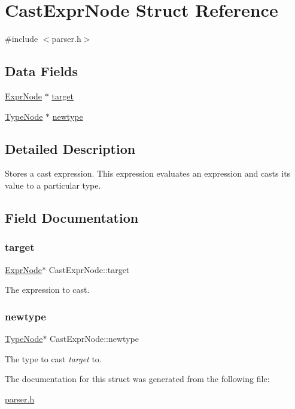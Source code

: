 \hypertarget{struct_cast_expr_node}{}\section{Cast\+Expr\+Node Struct Reference}
\label{struct_cast_expr_node}


{\ttfamily \#include $<$parser.\+h$>$}

\subsection*{Data Fields}
\begin{DoxyCompactItemize}
\item 
\hyperlink{struct_expr_node}{Expr\+Node} $\ast$ \hyperlink{struct_cast_expr_node_a90d1ac82b5b4a63a6842fc4e33f4e3bb}{target}
\item 
\hyperlink{struct_type_node}{Type\+Node} $\ast$ \hyperlink{struct_cast_expr_node_a0198b8265e221f2a52609a2d117585ef}{newtype}
\end{DoxyCompactItemize}


\subsection{Detailed Description}
Stores a cast expression. This expression evaluates an expression and casts its value to a particular type. 

\subsection{Field Documentation}
\mbox{\label{struct_cast_expr_node_a90d1ac82b5b4a63a6842fc4e33f4e3bb}} 
\subsubsection{\texorpdfstring{target}{target}}
{\footnotesize\ttfamily \hyperlink{struct_expr_node}{Expr\+Node}$\ast$ Cast\+Expr\+Node\+::target}

The expression to cast. \mbox{\label{struct_cast_expr_node_a0198b8265e221f2a52609a2d117585ef}} 
\subsubsection{\texorpdfstring{newtype}{newtype}}
{\footnotesize\ttfamily \hyperlink{struct_type_node}{Type\+Node}$\ast$ Cast\+Expr\+Node\+::newtype}

The type to cast {\itshape target} to. 

The documentation for this struct was generated from the following file\+:\begin{DoxyCompactItemize}
\item 
\hyperlink{parser_8h}{parser.\+h}\end{DoxyCompactItemize}
